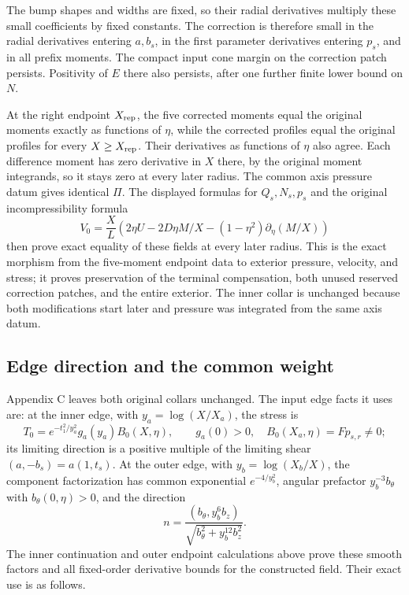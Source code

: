 \documentclass[10pt,a4paper]{article}
\begin{document}
The bump shapes and widths are fixed, so their radial derivatives multiply these small coefficients by fixed constants. The correction is therefore small in the radial derivatives entering \(a,b_s\), in the first parameter derivatives entering \(p_s\), and in all prefix moments. The compact input cone margin on the correction patch persists. Positivity of \(E\) there also persists, after one further finite lower bound on \(N\).

At the right endpoint \(X_{\rm rep}\), the five corrected moments equal the original moments exactly as functions of \(\eta\), while the corrected profiles equal the original profiles for every \(X\ge X_{\rm rep}\). Their derivatives as functions of \(\eta\) also agree. Each difference moment has zero derivative in \(X\) there, by the original moment integrands, so it stays zero at every later radius. The common axis pressure datum gives identical \(\Pi\). The displayed formulas for \(Q_s,N_s,p_s\) and the original incompressibility formula \[
V_0=\frac X L\left(2\eta U-2D\eta M/X-(1-\eta^2)\partial_\eta(M/X)\right)
\] then prove exact equality of these fields at every later radius. This is the exact morphism from the five-moment endpoint data to exterior pressure, velocity, and stress; it proves preservation of the terminal compensation, both unused reserved correction patches, and the entire exterior. The inner collar is unchanged because both modifications start later and pressure was integrated from the same axis datum.

\subsection{Edge direction and the common weight}\label{pa:edge-direction-and-the-common-weight}

Appendix C leaves both original collars unchanged. The input edge facts it uses are: at the inner edge, with \(y_a=\log(X/X_a)\), the stress is \[
T_0=e^{-t_1^2/y_a^2}g_a(y_a)B_0(X,\eta),\qquad
g_a(0)>0,\quad B_0(X_a,\eta)=F p_{s,r}\ne0;
\] its limiting direction is a positive multiple of the limiting shear \((a,-b_s)=a(1,t_s)\). At the outer edge, with \(y_b=\log(X_b/X)\), the component factorization has common exponential \(e^{-4/y_b^2}\), angular prefactor \(y_b^{-3}b_\theta\) with \(b_\theta(0,\eta)>0\), and the direction \[
n=\frac{(b_\theta,y_b^6b_z)}
{\sqrt{b_\theta^2+y_b^{12}b_z^2}}.
\] The inner continuation and outer endpoint calculations above prove these smooth factors and all fixed-order derivative bounds for the constructed field. Their exact use is as follows.
\end{document}
